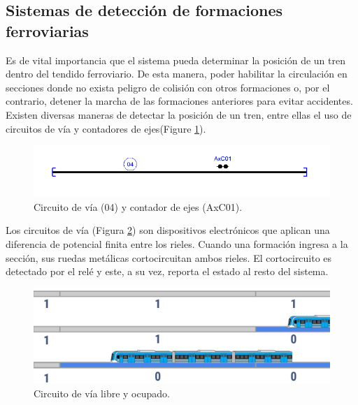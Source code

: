 \subsection{Sistemas de detección de formaciones ferroviarias}
    \label{sec:detectors}
    
    Es de vital importancia que el sistema pueda determinar la posición de un tren dentro del tendido ferroviario. De esta manera, poder habilitar la circulación en secciones donde no exista peligro de colisión con otros formaciones o, por el contrario, detener la marcha de las formaciones anteriores para evitar accidentes. Existen diversas maneras de detectar la posición de un tren, entre ellas el uso de circuitos de vía y contadores de ejes(Figure \ref{fig:deteccion_1}). 

    \begin{figure}[!h]
        \centering
        \includegraphics[width=1\textwidth]{Figuras/Detector.png}
        \centering\caption{Circuito de vía (04) y contador de ejes (AxC01).}
        \label{fig:deteccion_1}
    \end{figure}

    Los circuitos de vía (Figura \ref{fig:deteccion_2}) son dispositivos electrónicos que aplican una diferencia de potencial finita entre los rieles. Cuando una formación ingresa a la sección, sus ruedas metálicas cortocircuitan ambos rieles. El cortocircuito es detectado por el relé y este, a su vez, reporta el estado al resto del sistema. 

    \begin{figure}[!h]
        \centering
        \includegraphics[width=1\textwidth]{Figuras/circuito_via}
        \centering\caption{Circuito de vía libre y ocupado.}
        \label{fig:deteccion_2}
    \end{figure}

